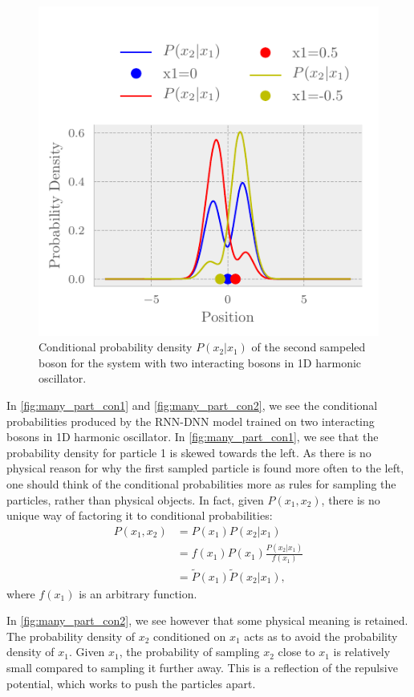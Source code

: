 \begin{figure}[H]
	\includegraphics[]{figures/many_part_con2.pdf}
	\caption{Conditional probability density $P(x_2|x_1)$ of the second sampeled boson for the system with two interacting bosons in 1D harmonic oscillator.} 
	\label{fig:many_part_con2}
\end{figure}

In \autoref{fig:many_part_con1} and \autoref{fig:many_part_con2}, we see the
conditional probabilities produced by the RNN-DNN model trained on two
interacting bosons in 1D harmonic oscillator. In \autoref{fig:many_part_con1},
we see that the probability density for particle 1 is skewed towards the left.
As there is no physical reason for why the first sampled particle is found more
often to the left, one should think of the conditional probabilities more as
rules for sampling the particles, rather than physical objects. In fact, given
$P(x_1, x_2)$, there is no unique way of factoring it to conditional
probabilities:  
\begin{align*}
	P(x_1, x_2) &= P(x_1)P(x_2|x_1)\\
                &= f(x_1)P(x_1)\frac{P(x_2|x_1)}{f(x_1)}\\
                &= \tilde{P}(x_1)\tilde{P}(x_2|x_1),
\end{align*}
where $f(x_1)$ is an arbitrary function. 

In \autoref{fig:many_part_con2}, we see however that some physical meaning is
retained. The probability density of \(x_{2}\) conditioned on \(x_{1}\)
acts as to avoid the probability density of \(x_{1}\). Given \(x_{1}\), the
probability of sampling \(x_{2}\) close to \(x_{1}\) is relatively small
compared to sampling it further away. This is a reflection of the repulsive
potential, which works to push the particles apart. 
 
